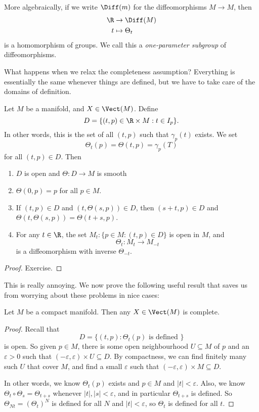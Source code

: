 \documentclass[a4paper]{article}
\begin{document}
More algebraically, if we write $\Diff(m)$ for the diffeomorphisms $M \to M$, then
\begin{align*}
  \R &\to \Diff(M)\\
  t &\mapsto \Theta_t
\end{align*}
is a homomorphism of groups. We call this a \emph{one-parameter subgroup} of diffeomorphisms.

What happens when we relax the completeness assumption? Everything is essentially the same whenever things are defined, but we have to take care of the domains of definition.

\begin{thm}
  Let $M$ be a manifold, and $X \in \Vect(M)$. Define
  \[
    D = \{(t, p) \in \R \times M: t \in I_p\}.
  \]
  In other words, this is the set of all $(t, p)$ such that $\gamma_p(t)$ exists. We set
  \[
    \Theta_t (p) = \Theta(t, p) = \gamma_p(T)
  \]
  for all $(t, p) \in D$. Then
  \begin{enumerate}
    \item $D$ is open and $\Theta: D \to M$ is smooth
    \item $\Theta(0, p) = p$ for all $p \in M$.
    \item If $(t, p) \in D$ and $(t, \Theta(s, p)) \in D$, then $(s + t, p) \in D$ and $\Theta(t, \Theta(s, p)) = \Theta(t + s, p)$.
    \item For any $t \in \R$, the set $M_t: \{p \in M: (t, p) \in D\}$ is open in $M$, and
      \[
        \Theta_t: M_t \to M_{-t}
      \]
      is a diffeomorphism with inverse $\Theta_{-t}$.
  \end{enumerate}
\end{thm}

\begin{proof}
  Exercise.
\end{proof}

This is really annoying. We now prove the following useful result that saves us from worrying about these problems in nice cases:
\begin{prop}
  Let $M$ be a compact manifold. Then any $X \in \Vect(M)$ is complete.
\end{prop}

\begin{proof}
  Recall that
  \[
    D = \{(t, p): \Theta_t(p)\text{ is defined }\}
  \]
  is open. So given $p \in M$, there is some open neighbourhood $U \subseteq M$ of $p$ and an $\varepsilon > 0$ such that $(-\varepsilon, \varepsilon) \times U \subseteq D$. By compactness, we can find finitely many such $U$ that cover $M$, and find a small $\varepsilon$ such that $(-\varepsilon, \varepsilon) \times M \subseteq D$.

  In other words, we know $\Theta_t(p)$ exists and $p \in M$ and $|t| < \varepsilon$. Also, we know $\Theta_t \circ \Theta_s = \Theta_{t + s}$ whenever $|t|, |s| < \varepsilon$, and in particular $\Theta_{t + s}$ is defined. So $\Theta_{Nt} = (\Theta_t)^N$ is defined for all $N$ and $|t| < \varepsilon$, so $\Theta_t$ is defined for all $t$.
\end{proof}
\end{document}
